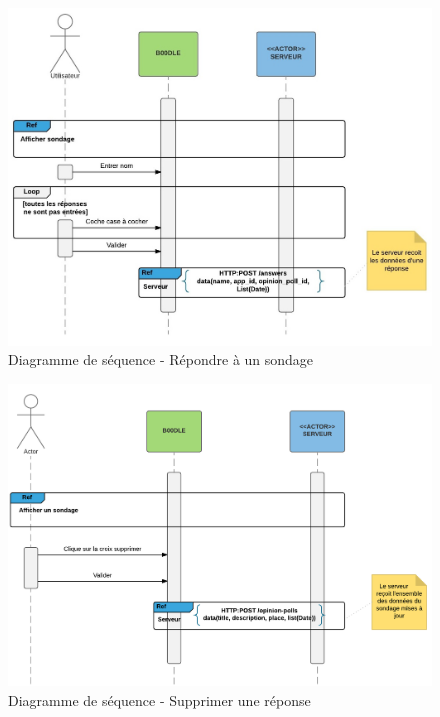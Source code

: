 \documentclass[titlepage]{report}
\begin{document}
\begin{figure}[h]
	\caption{Diagramme de séquence - Répondre à un sondage}
	\label{annexe_diagramme_repondreSondage}
	\centering
	\includegraphics[width=\textwidth]{figures/diagrammes/sequence_repondreSondage.png}
\end{figure}

\begin{figure}[h]
	\caption{Diagramme de séquence - Supprimer une réponse}
	\label{annexe_diagramme_supprimerReponse}
	\centering
	\includegraphics[width=\textwidth]{figures/diagrammes/sequence_supprimerReponse.png}
\end{figure}
\end{document}

